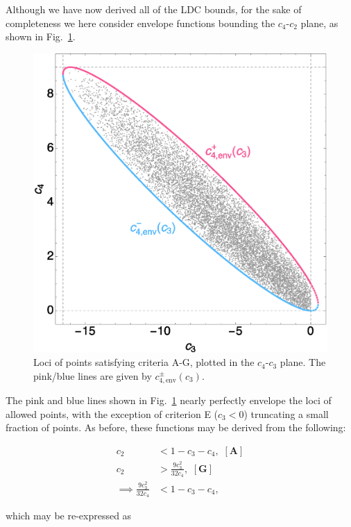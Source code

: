 Although we have now derived all of the LDC bounds, for the sake of 
completeness we here consider envelope functions bounding the $c_4$-$c_2$ plane, 
as shown in Fig.~\ref{fig:c4c3surface}.

\begin{figure}
\includegraphics[width=\columnwidth]{c4c3surface.eps}
\caption{
Loci of points satisfying criteria A-G, plotted in the $c_4$-$c_3$ plane.
The pink/blue lines are given by $c_{4,\mathrm{env}}^{\pm}(c_3)$.
}
\label{fig:c4c3surface}
\end{figure}

The pink and blue lines shown in Fig.~\ref{fig:c4c3surface} nearly perfectly
envelope the loci of allowed points, with the exception of criterion 
E ($c_3<0$) truncating a small fraction of points. As before, these functions
may be derived from the following:

\begin{align}
c_2 &< 1 - c_3 - c_4,\,\,\mathbf{[A]}\nonumber\\
c_2 &> \frac{9 c_3^2}{32 c_4},\,\,\mathbf{[G]}\nonumber\\
\implies \frac{9 c_3^2}{32 c_4} &< 1 - c_3 - c_4,
\end{align}

which may be re-expressed as

